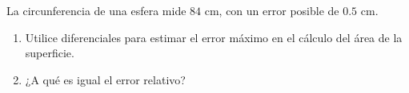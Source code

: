 \item La circunferencia de una esfera mide $84 \text{ cm}$, con un error posible de $0.5 \text{ cm}$.
\begin{enumerate}
    \item[(a)] Utilice diferenciales para estimar el error máximo en el cálculo del área de la superficie.
    \item[(b)] ¿A qué es igual el error relativo?
\end{enumerate}
